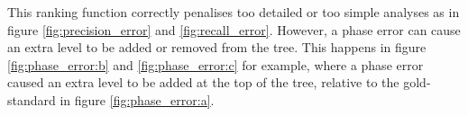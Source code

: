 This ranking function correctly penalises too detailed or too simple analyses as in figure \ref{fig:precision_error} and \ref{fig:recall_error}. However, a phase error can cause an extra level to be added or removed from the tree. This happens in figure \ref{fig:phase_error:b} and \ref{fig:phase_error:c} for example, where a phase error caused an extra level to be added at the top of the tree, relative to the gold-standard in figure \ref{fig:phase_error:a}. 






